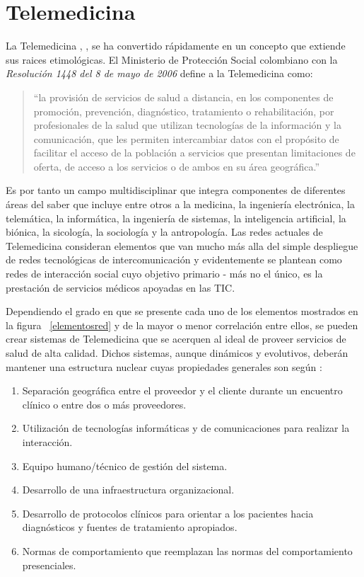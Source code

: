 \section{Telemedicina}

La Telemedicina \cite{aim}, \cite{bashshur77}, \cite{itu} se ha convertido rápidamente en un concepto que extiende sus raices etimológicas. El Ministerio de Protección Social colombiano con la \textit{Resolución 1448 del 8 de mayo de 2006} define a la Telemedicina como:
\begin{quote}
“la provisión de servicios de salud a distancia, en los componentes de promoción, prevención, diagnóstico, tratamiento o rehabilitación, por profesionales de la salud que utilizan tecnologías de la información y la comunicación, que les permiten intercambiar datos con el propósito de facilitar el acceso de la población a servicios que presentan limitaciones de oferta, de acceso a los servicios o de ambos en su área geográfica.”
\end{quote} 

Es por tanto un campo multidisciplinar que integra componentes de diferentes áreas del saber que incluye entre otros a la medicina, la ingeniería electrónica, la telemática, la informática, la ingeniería de sistemas, la inteligencia artificial, la biónica, la sicología, la sociología y la antropología. Las redes actuales de Telemedicina consideran elementos que van mucho más alla del simple despliegue de redes tecnológicas de intercomunicación y evidentemente se plantean como redes de interacción social cuyo objetivo primario - más no el único, es la prestación de servicios médicos apoyadas en las TIC.

Dependiendo el grado en que se presente cada uno de los elementos mostrados en la figura ~\ref{elementosred} y de la mayor o menor correlación entre ellos, se pueden crear sistemas de Telemedicina que se acerquen al ideal de proveer servicios de salud de alta calidad. Dichos sistemas, aunque dinámicos y evolutivos, deberán mantener una estructura nuclear cuyas propiedades generales son según \cite{bashshur95}: 
\begin{enumerate}
\item Separación geográfica entre el proveedor y el cliente durante un encuentro clínico o entre dos o más proveedores.
\item Utilización de tecnologías informáticas y de comunicaciones para realizar la interacción. 
\item Equipo humano/técnico de gestión del sistema. 
\item Desarrollo de una infraestructura organizacional. 
\item Desarrollo de protocolos clínicos para orientar a los pacientes hacia diagnósticos y fuentes de tratamiento apropiados. 
\item Normas de comportamiento que reemplazan las normas del comportamiento presenciales.
\end{enumerate}

